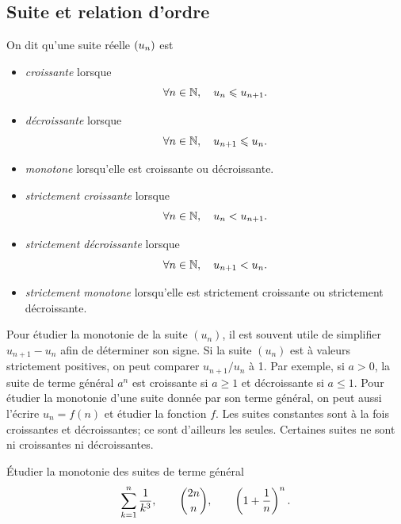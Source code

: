 \documentclass{magnolia}
\begin{document}
\subsection{Suite et relation d'ordre}

\begin{definition}[utile=-3]
On dit qu'une suite réelle $\left(u_n\right)$ est
\begin{itemize}
\item \emph{croissante} lorsque
  \[\forall n\in\mathbb{N} ,\quad u_n \leqslant u_{n+1}.\]
\item \emph{décroissante} lorsque
  \[\forall n\in\mathbb{N} ,\quad u_{n+1} \leqslant u_n.\]
\item \emph{monotone} lorsqu'elle est croissante ou décroissante.
\item \emph{strictement croissante} lorsque
  \[\forall n\in\mathbb{N} ,\quad u_n < u_{n+1}.\]
\item \emph{strictement décroissante} lorsque
  \[\forall n\in\mathbb{N} ,\quad u_{n+1} < u_n.\]
\item \emph{strictement monotone} lorsqu'elle est strictement croissante ou
  strictement décroissante.
\end{itemize}
\end{definition}

\begin{remarques}
\remarque Pour étudier la monotonie de la suite $(u_n)$, il est souvent utile
  de simplifier $u_{n+1}-u_n$ afin de déterminer son signe.
  Si la suite $(u_n)$ est à valeurs strictement positives, on peut comparer
  $u_{n+1}/u_n$ à 1. Par exemple, si $a>0$, la suite de terme général $a^n$ est
  croissante si $a\geq 1$ et décroissante si $a\leq 1$.
\remarque Pour étudier la monotonie d'une suite donnée par son terme général,
  on peut aussi l'écrire $u_n=f(n)$ et étudier la fonction $f$.
\remarque Les suites constantes sont à la fois croissantes et décroissantes;
  ce sont d'ailleurs les seules. Certaines suites ne sont ni croissantes
  ni décroissantes.
\end{remarques}

\begin{exoUnique}
\exo Étudier la monotonie des suites de terme général
  \[\sum_{k=1}^n \frac{1}{k^3}, \qquad \binom{2n}{n}, %
    \qquad \p{1+\frac{1}{n}}^n.\]
\end{exoUnique}
\end{document}
